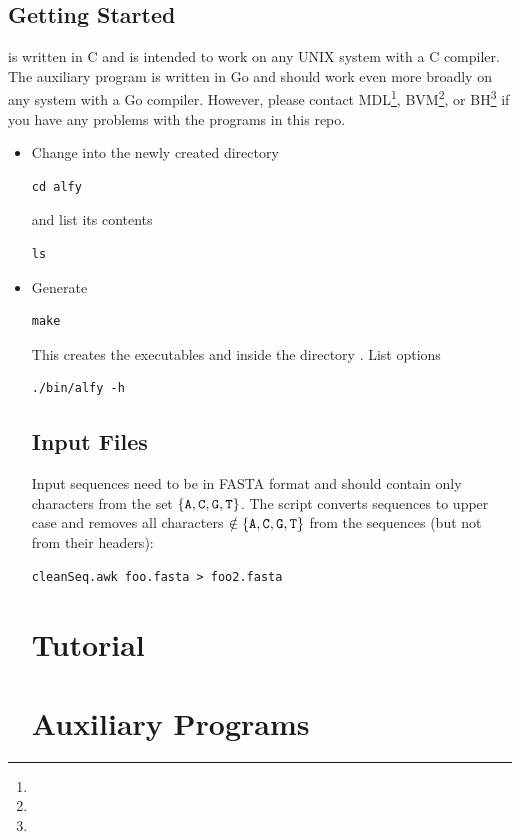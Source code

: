 \documentclass{report}
\begin{document}
\section{Getting Started}
 is written in C and is intended to work on any UNIX system
with a C compiler. The auxiliary program  is written in Go
and should work even more broadly on any system with a Go
compiler. However, please contact
MDL\footnote{},
BVM\footnote{}, or
BH\footnote{} if you have any problems with
the programs in this repo.
\begin{itemize}
  \I Download 
\begin{verbatim}
git clone https://github.com/evolbioinf/alfy
\end{verbatim}
\item Change into the newly created directory
\begin{verbatim}
cd alfy  
\end{verbatim}
and list its contents
\begin{verbatim}
ls
\end{verbatim}
\item Generate 
\begin{verbatim}
make
\end{verbatim}
This creates the executables  and  inside the
directory .  \I List options
\begin{verbatim}
./bin/alfy -h
\end{verbatim}
\ei

\section{Input Files}
Input sequences need to be in FASTA format and should contain only characters
from the set $\{\texttt{A}, \texttt{C}, \texttt{G}, \texttt{T}\}$. The script
 converts sequences to upper case and
removes all characters $\notin \{\texttt{A}, \texttt{C}, \texttt{G}, \texttt{T}\}$
from the sequences (but not from their headers):
\begin{verbatim}
cleanSeq.awk foo.fasta > foo2.fasta
\end{verbatim}

\chapter{Tutorial}


\chapter{Auxiliary Programs}

\end{itemize}
\end{document}
